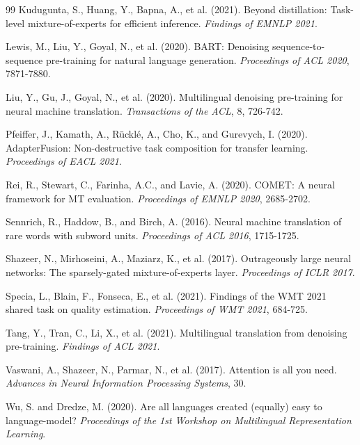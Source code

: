 \documentclass[11pt,twocolumn]{article}
\begin{document}
\begin{thebibliography}{99}
Kudugunta, S., Huang, Y., Bapna, A., et al. (2021).
Beyond distillation: Task-level mixture-of-experts for efficient inference.
\textit{Findings of EMNLP 2021}.

Lewis, M., Liu, Y., Goyal, N., et al. (2020).
BART: Denoising sequence-to-sequence pre-training for natural language generation.
\textit{Proceedings of ACL 2020}, 7871-7880.

Liu, Y., Gu, J., Goyal, N., et al. (2020).
Multilingual denoising pre-training for neural machine translation.
\textit{Transactions of the ACL}, 8, 726-742.

Pfeiffer, J., Kamath, A., R{\"u}ckl{\'e}, A., Cho, K., and Gurevych, I. (2020).
AdapterFusion: Non-destructive task composition for transfer learning.
\textit{Proceedings of EACL 2021}.

Rei, R., Stewart, C., Farinha, A.C., and Lavie, A. (2020).
COMET: A neural framework for MT evaluation.
\textit{Proceedings of EMNLP 2020}, 2685-2702.

Sennrich, R., Haddow, B., and Birch, A. (2016).
Neural machine translation of rare words with subword units.
\textit{Proceedings of ACL 2016}, 1715-1725.

Shazeer, N., Mirhoseini, A., Maziarz, K., et al. (2017).
Outrageously large neural networks: The sparsely-gated mixture-of-experts layer.
\textit{Proceedings of ICLR 2017}.

Specia, L., Blain, F., Fonseca, E., et al. (2021).
Findings of the WMT 2021 shared task on quality estimation.
\textit{Proceedings of WMT 2021}, 684-725.

Tang, Y., Tran, C., Li, X., et al. (2021).
Multilingual translation from denoising pre-training.
\textit{Findings of ACL 2021}.

Vaswani, A., Shazeer, N., Parmar, N., et al. (2017).
Attention is all you need.
\textit{Advances in Neural Information Processing Systems}, 30.

Wu, S. and Dredze, M. (2020).
Are all languages created (equally) easy to language-model?
\textit{Proceedings of the 1st Workshop on Multilingual Representation Learning}.

\end{thebibliography}
\end{document}

